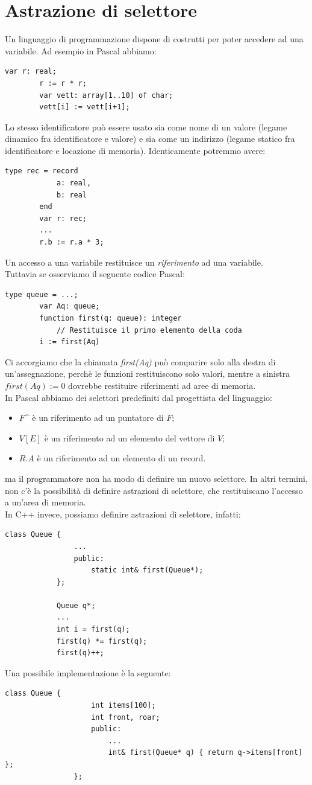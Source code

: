 \documentclass[12pt]{report}
\begin{document}
 	\section{Astrazione di selettore}
 	Un linguaggio di programmazione dispone di costrutti per poter accedere ad una variabile. Ad esempio in Pascal abbiamo:
 	\begin{lstlisting}[style=pascalstyle]
 		var r: real;
 		r := r * r;
 		var vett: array[1..10] of char;
 		vett[i] := vett[i+1];
 	\end{lstlisting}
 	Lo stesso identificatore può essere usato sia come nome di un valore (legame dinamico fra identificatore e valore) e sia come un indirizzo (legame statico fra identificatore e locazione di memoria). Identicamente potremmo avere:
 	\begin{lstlisting}[style=pascalstyle]
 		type rec = record
 			a: real,
 			b: real
 		end
 		var r: rec;
 		...
 		r.b := r.a * 3;\end{lstlisting}
	Un accesso a una variabile restituisce un \textit{riferimento} ad una variabile.\\
	Tuttavia se osserviamo il seguente codice Pascal:
	\begin{lstlisting}[style=pascalstyle]
		type queue = ...;
		var Aq: queue;
		function first(q: queue): integer
			// Restituisce il primo elemento della coda
		i := first(Aq)\end{lstlisting}
		Ci accorgiamo che la chiamata \textit{first(Aq)} può comparire solo alla destra di un'assegnazione, perchè le funzioni restituiscono solo valori, mentre a sinistra $first(Aq) := 0$ dovrebbe restituire riferimenti ad aree di memoria. \\
		In Pascal abbiamo dei selettori predefiniti dal progettista del linguaggio:
		\begin{itemize}
			\item $F$\^{} è un riferimento ad un puntatore di $F$;
			\item $V[E]$ è un riferimento ad un elemento del vettore di $V$;
			\item $R.A$ è un riferimento ad un elemento di un record.
		\end{itemize}
		ma il programmatore non ha modo di definire un nuovo selettore. In altri termini, non c'è la possibilità di definire astrazioni di selettore, che restituiscano l'accesso a un'area di memoria. \\
		In C++ invece, possiamo  definire astrazioni di selettore, infatti:
		\begin{lstlisting}[style=cppstyle]
			class Queue {
				...
				public:
					static int& first(Queue*);
			};

			Queue q*;
			...
			int i = first(q);
			first(q) *= first(q);
			first(q)++;\end{lstlisting}
			Una possibile implementazione è la seguente:
			\begin{lstlisting}[style=cppstyle]
				class Queue {
					int items[100];
					int front, roar;
					public:
						...
						int& first(Queue* q) { return q->items[front] };
				};\end{lstlisting}
\end{document}
